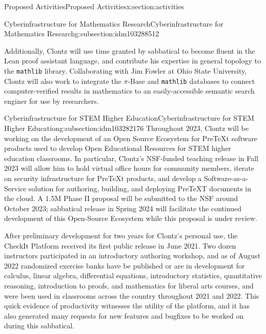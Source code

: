 \documentclass[oneside,10pt,]{article}
\newcommand{\mono}[1]{\texttt{#1}}
\begin{document}
\begin{sectionptx}{Proposed Activities}{}{Proposed Activities}{}{}{x:section:activities}
\begin{subsectionptx}{Cyberinfrastructure for Mathematics Research}{}{Cyberinfrastructure for Mathematics Research}{}{}{g:subsection:idm103288512}
\par
Additionally, Clontz will use time granted by sabbatical to become fluent in the Lean proof assistant language, and contribute his expertise in general topology to the \mono{mathlib} library. Collaborating with Jim Fowler at Ohio State University, Clontz will also work to integrate the \(\pi\)-Base and \mono{mathlib} databases to connect computer-verified results in mathematics to an easily-accessible semantic search enginer for use by researchers.%
\end{subsectionptx}
%
%
\typeout{************************************************}
\typeout{************************************************}
%
\begin{subsectionptx}{Cyberinfrastructure for STEM Higher Education}{}{Cyberinfrastructure for STEM Higher Education}{}{}{g:subsection:idm103282176}
Throughout 2023, Clontz will be working on the development of an Open Source Ecosystem for PreTeXt software products used to develop Open Educational Resources for STEM higher education classrooms. In particular, Clontz's NSF-funded teaching release in Fall 2023 will allow him to hold virtual office hours for community members, iterate on security infrastructure for PreTeXt products, and develop a Software-as-a-Service solution for authoring, building, and deploying PreTeXT documents in the cloud. A \textdollar{}1.5M Phase II proposal will be submitted to the NSF around October 2023; sabbatical release in Spring 2024 will facilitate the continued development of this Open-Source Ecosystem while this proposal is under review.%
\par
After preliminary development for two years for Clontz's personal use, the CheckIt Platform received its first public release in June 2021. Two dozen instructors participated in an introductory authoring workshop, and as of August 2022 randomized exercise banks have be published or are in development for calculus, linear algebra, differential equations, introductory statistics, quantitative reasoning, introduction to proofs, and mathematics for liberal arts courses, and were been used in classrooms across the country throughout 2021 and 2022. This quick evidence of productivity witnesses the utility of the platform, and it has also generated many requests for new features and bugfixes to be worked on during this sabbatical.%
\par

\end{subsectionptx}
\end{sectionptx}
\end{document}
